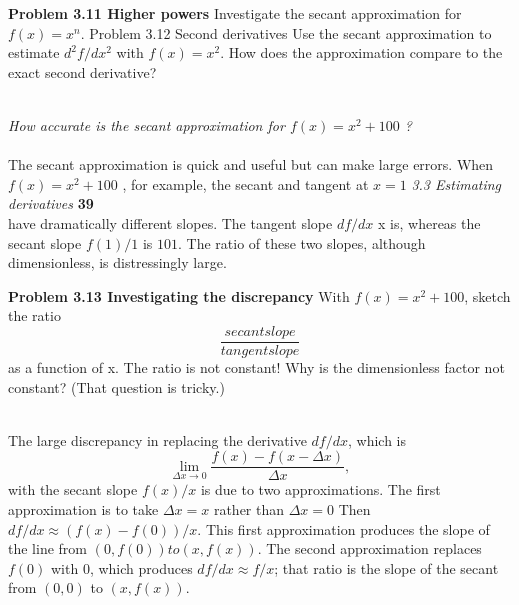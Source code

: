 \documentclass[a4paper, 12pt]{book}
\begin{document}
    \colorbox{light-gray}{
    \begin{minipage}{\textwidth}
    \textbf{Problem 3.11 Higher powers}
    Investigate
    the secant approximation for$f(x)=x^n$.
    Problem 3.12 Second derivatives
    Use the secant approximation to estimate $d^2f/dx^2$ with $f(x) = x^2$. How does the approximation compare to the exact second derivative?
    \end{minipage}}
    \\
    {\it How accurate is the secant approximation for $f(x)=x^2+100$ ?}\\
    \\
    The secant approximation is quick and useful but can make large errors.
    When $f(x)= x^2+100$ , for example, the secant and tangent at $x=1$
    \newpage
    \noindent
    \large\textit{3.3 Estimating derivatives} \hfill \textbf{39} \\

    have dramatically different slopes. The tangent slope $df/dx$ x is, whereas
    the secant slope $f(1)/1$ is $101$. The ratio of these two slopes, although dimensionless, is distressingly large.\\
    \colorbox{light-gray}{
    \begin{minipage}{\textwidth}
    \textbf{Problem 3.13 Investigating the discrepancy}
    With $f(x) = x^2 + 100$, sketch the ratio
    \begin{equation}\frac{secant slope}{tangent slope}\end{equation}
    as a function of x. The ratio is not constant! Why is the dimensionless factor not
    constant? (That question is tricky.)
    \end{minipage}} \\
    The large discrepancy in replacing the derivative $df/dx$, which is
    \begin{equation}\lim_{\Delta x\to0}\frac{f(x)-f(x-\Delta x)}{\Delta x},\end{equation}
    with the secant slope $f(x)/x$ is due to two approximations. The first
    approximation is to take $\Delta x=x$ rather than $\Delta x=0$ Then $ df/dx\approx
    (f(x) − f(0))/x$. This first approximation produces the slope of the line
    from $(0, f(0)) to (x, f(x))$. The second approximation replaces $f(0)$ with
    $0$, which produces $df/dx\approx f/x$; that ratio is the slope of the secant from $(0, 0)$ to $(x, f(x)).$ \\
\end{document}
